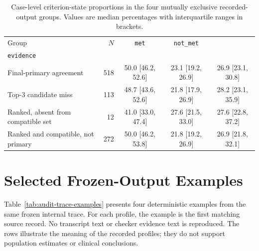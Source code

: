 \documentclass[12pt,a4paper,oneside]{report}
\begin{document}
\begin{table}[htbp]
\centering
\caption{Case-level criterion-state proportions in the four mutually exclusive recorded-output groups. Values are median percentages with interquartile ranges in brackets.}
\label{tab:ch8-criterion-ratios}
\small
\setlength{\tabcolsep}{4pt}
\renewcommand{\arraystretch}{1.08}
\begin{tabularx}{\textwidth}{|X|r|c|c|c|}
\hline
Group & $N$ & \texttt{met} & \texttt{not\_met} & \shortstack{\texttt{insufficient\_}\\\texttt{evidence}}\\
\hline
Final-primary agreement & 518 & 50.0 [46.2, 52.6] & 23.1 [19.2, 26.9] & 26.9 [23.1, 30.8]\\
\hline
Top-3 candidate miss & 113 & 48.7 [43.6, 52.6] & 21.8 [17.9, 26.9] & 28.2 [23.1, 35.9]\\
\hline
Ranked, absent from compatible set & 12 & 41.0 [33.0, 47.4] & 27.6 [21.5, 33.0] & 27.6 [22.8, 37.2]\\
\hline
Ranked and compatible, not primary & 272 & 50.0 [46.2, 53.8] & 21.8 [19.2, 26.9] & 26.9 [21.8, 32.1]\\
\hline
\end{tabularx}
\renewcommand{\arraystretch}{1.0}
\end{table}

\section{Selected Frozen-Output Examples}
\label{sec:ch8-trace-boundaries}

Table~\ref{tab:audit-trace-examples} presents four deterministic examples from the same frozen internal trace. For each profile, the example is the first matching source record. No transcript text or checker evidence text is reproduced. The rows illustrate the meaning of the recorded profiles; they do not support population estimates or clinical conclusions.
\end{document}
